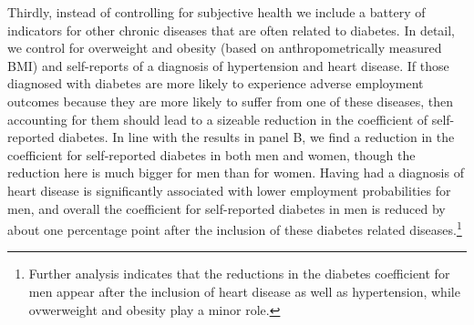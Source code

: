 \documentclass[12pt,english]{article}
\begin{document}
Thirdly, instead of controlling for subjective health we include a battery of indicators for other chronic diseases that are often related to diabetes. In detail, we control for overweight and obesity (based on anthropometrically measured \ac{BMI}) and self-reports of a diagnosis of hypertension and heart disease. If those diagnosed with diabetes are more likely to experience adverse employment outcomes because they are more likely to suffer from one of these diseases, then accounting for them should lead to a sizeable reduction in the coefficient of self-reported diabetes. In line with the results in panel B, we find a reduction in the coefficient for self-reported diabetes in both men and women, though the reduction here is much bigger for men than for women. Having had a diagnosis of heart disease is significantly associated with lower employment probabilities for men, and overall the coefficient for self-reported diabetes in men is reduced by about one percentage point after the inclusion of these diabetes related diseases.\footnote{Further analysis indicates that the reductions in the diabetes coefficient for men appear after the inclusion of heart disease as well as hypertension, while ovwerweight and obesity play a minor role.}
\end{document}
